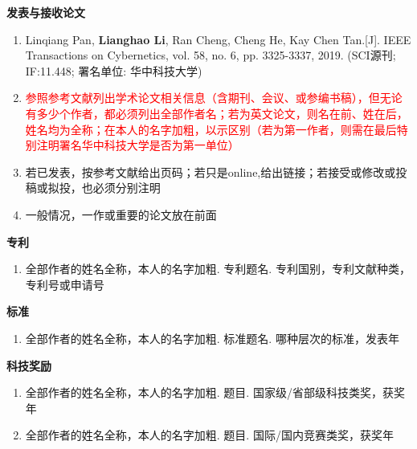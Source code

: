 \begin{publications}
\noindent
\textbf{发表与接收论文}
\renewcommand{\labelenumi}{[\arabic{enumi}]}
\begin{enumerate}
\item Linqiang Pan, \textbf{Lianghao Li}, Ran Cheng, Cheng He, Kay Chen Tan.[J]. IEEE Transactions on Cybernetics, vol. 58, no. 6, pp. 3325-3337, 2019. (SCI源刊; IF:11.448; 署名单位: 华中科技大学)
\item \textcolor{red}{参照参考文献列出学术论文相关信息（含期刊、会议、或参编书稿），但无论有多少个作者，都必须列出全部作者名；若为英文论文，则名在前、姓在后，姓名均为全称；在本人的名字加粗，以示区别（若为第一作者，则需在最后特别注明署名华中科技大学是否为第一单位）} 
\item 若已发表，按参考文献给出页码；若只是online,给出链接；若接受或修改或投稿或拟投，也必须分别注明
\item 一般情况，一作或重要的论文放在前面
\end{enumerate}
\textbf{专\hspace{2em}利}
\renewcommand{\labelenumi}{[\arabic{enumi}]}
\begin{enumerate}
\item 全部作者的姓名全称，本人的名字加粗. 专利题名. 专利国别，专利文献种类，专利号或申请号
\end{enumerate}
\textbf{标\hspace{2em}准}
\renewcommand{\labelenumi}{[\arabic{enumi}]}
\begin{enumerate}
\item 全部作者的姓名全称，本人的名字加粗. 标准题名. 哪种层次的标准，发表年
\end{enumerate}
\textbf{科技奖励}
\renewcommand{\labelenumi}{[\arabic{enumi}]}
\begin{enumerate}
\item 全部作者的姓名全称，本人的名字加粗. 题目. 国家级/省部级科技类奖，获奖年
\item 全部作者的姓名全称，本人的名字加粗. 题目. 国际/国内竞赛类奖，获奖年
\end{enumerate}
\end{publications}
